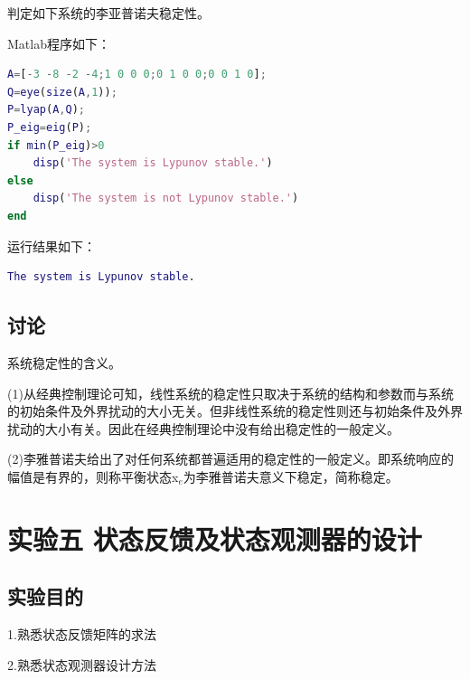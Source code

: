 \documentclass[UTF8]{ctexart}
\begin{document}
\par 判定如下系统的李亚普诺夫稳定性。
\par Matlab程序如下：
\par  \begin{lstlisting}[language=matlab,escapeinside=``]	
A=[-3 -8 -2 -4;1 0 0 0;0 1 0 0;0 0 1 0];
Q=eye(size(A,1));
P=lyap(A,Q);
P_eig=eig(P);
if min(P_eig)>0
    disp('The system is Lypunov stable.')
else 
    disp('The system is not Lypunov stable.')
end
\end{lstlisting}
\par 运行结果如下：		
\par  \begin{lstlisting}[language=matlab,escapeinside=``]			
	The system is Lypunov stable.	
\end{lstlisting}		
	
\subsection{讨论}	
\par 系统稳定性的含义。	
\par  (1)从经典控制理论可知，线性系统的稳定性只取决于系统的结构和参数而与系统的初始条件及外界扰动的大小无关。但非线性系统的稳定性则还与初始条件及外界扰动的大小有关。因此在经典控制理论中没有给出稳定性的一般定义。
\par  (2)李雅普诺夫给出了对任何系统都普遍适用的稳定性的一般定义。即系统响应的幅值是有界的，则称平衡状态x$_{e}$为李雅普诺夫意义下稳定，简称稳定。
	
	
\newpage
\section{实验五 \quad 状态反馈及状态观测器的设计}
\subsection{ 实验目的 }
\par 1.熟悉状态反馈矩阵的求法
\par 2.熟悉状态观测器设计方法
\end{document}
